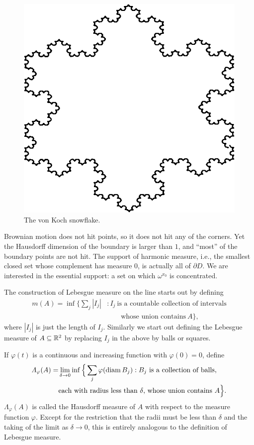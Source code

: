 \bigskip
\begin{figure}[ht]
    \centering\includegraphics{Images/Img11.png}
    \bigskip
    \caption{The von Koch snowflake.}
    \label{fig:ch5_4.1}
\end{figure}

Brownian motion does not hit points, so it does not hit any of the corners. Yet the Hausdorff dimension of the boundary is larger than $1$, and ``most'' of the boundary points are not hit. The support of harmonic measure, i.e., the smallest closed set whose complement has measure $0$, is actually all of $\partial D$. We are interested in the essential support: a set on which $\omega^{x_0}$ is concentrated.

\mpagebreak

The construction of Lebesgue measure on the line starts out by defining
\begin{align*}
    m(A) = \inf\Big\{\sum_j |I_j| &: I_j~\text{is a countable collection of intervals} \\
    &\qquad\!\text{whose union contains}~A\Big\},
\end{align*}
where $|I_j|$ is just the length of $I_j$. Similarly we start out defining the Le\-besgue measure of $A \subseteq \mathbb{R}^2$ by replacing $I_j$ in the above by balls or squares.

If $\varphi(t)$ is a continuous and increasing function with $\varphi(0) = 0$, define
\begin{align}\label{eq:ch5_4.17}
    \varLambda_\varphi(A) = &\lim_{\delta\to 0}\inf\Big\{\sum_j \varphi(\operatorname{diam} B_j) : B_j~\text{is a collection of balls,} \\
    &\text{each with radius less than}~\delta\text{, whose union contains}~A\Big\}. \notag
\end{align}
$\Lambda_\varphi(A)$ is called the Hausdorff measure of $A$ with respect to the measure function $\varphi$. Except for the restriction that the radii must be less than $\delta$ and the taking of the limit as $\delta \to 0$, this is entirely analogous to the definition of Lebesgue measure.

